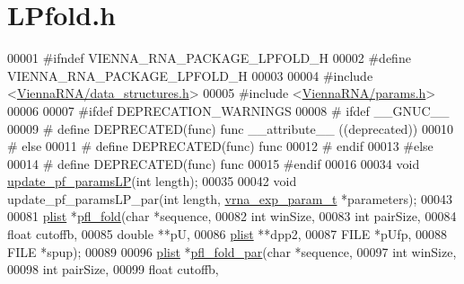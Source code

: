 \hypertarget{LPfold_8h_source}{}\section{L\+Pfold.\+h}
\label{LPfold_8h_source}

\begin{DoxyCode}
00001 \textcolor{preprocessor}{#ifndef VIENNA\_RNA\_PACKAGE\_LPFOLD\_H}
00002 \textcolor{preprocessor}{#define VIENNA\_RNA\_PACKAGE\_LPFOLD\_H}
00003 
00004 \textcolor{preprocessor}{#include <\hyperlink{data__structures_8h}{ViennaRNA/data\_structures.h}>}
00005 \textcolor{preprocessor}{#include <\hyperlink{params_8h}{ViennaRNA/params.h}>}
00006 
00007 \textcolor{preprocessor}{#ifdef DEPRECATION\_WARNINGS}
00008 \textcolor{preprocessor}{# ifdef \_\_GNUC\_\_}
00009 \textcolor{preprocessor}{#  define DEPRECATED(func) func \_\_attribute\_\_ ((deprecated))}
00010 \textcolor{preprocessor}{# else}
00011 \textcolor{preprocessor}{#  define DEPRECATED(func) func}
00012 \textcolor{preprocessor}{# endif}
00013 \textcolor{preprocessor}{#else}
00014 \textcolor{preprocessor}{# define DEPRECATED(func) func}
00015 \textcolor{preprocessor}{#endif}
00016 
00034 \textcolor{keywordtype}{void} \hyperlink{group__local__pf__fold_ga5a019014d37fe6105131dfc2fc447880}{update\_pf\_paramsLP}(\textcolor{keywordtype}{int} length);
00035 
00042 \textcolor{keywordtype}{void} update\_pf\_paramsLP\_par(\textcolor{keywordtype}{int} length, \hyperlink{group__energy__parameters_structvrna__exp__param__s}{vrna\_exp\_param\_t} *parameters);
00043 
00081 \hyperlink{group__data__structures_structvrna__plist__s}{plist} *\hyperlink{group__local__pf__fold_ga7dcf599d07258801ea55e7d14a56908d}{pfl\_fold}(\textcolor{keywordtype}{char} *sequence,
00082                 \textcolor{keywordtype}{int} winSize,
00083                 \textcolor{keywordtype}{int} pairSize,
00084                 \textcolor{keywordtype}{float} cutoffb,
00085                 \textcolor{keywordtype}{double} **pU,
00086                 \hyperlink{group__data__structures_structvrna__plist__s}{plist} **dpp2,
00087                 FILE *pUfp,
00088                 FILE *spup);
00089 
00096 \hyperlink{group__data__structures_structvrna__plist__s}{plist} *\hyperlink{group__local__pf__fold_ga14c2b82fdd5ab7a1951f1c2db4f5cf2c}{pfl\_fold\_par}(\textcolor{keywordtype}{char} *sequence,
00097                     \textcolor{keywordtype}{int} winSize,
00098                     \textcolor{keywordtype}{int} pairSize,
00099                     \textcolor{keywordtype}{float} cutoffb,

\end{DoxyCode}
